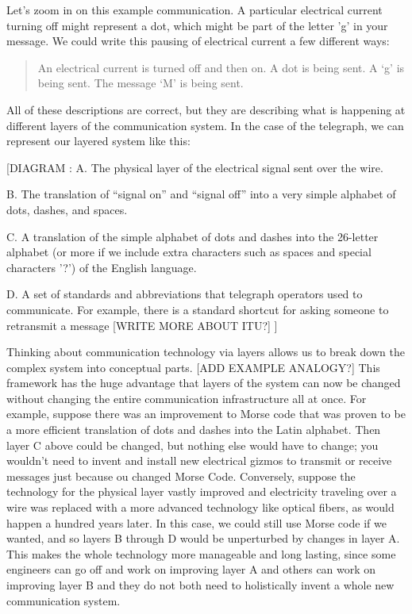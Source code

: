 \documentclass[UTF8]{book}
\begin{document}
\begin{CJK}{UTF8}{gbsn}
Let's zoom in on this example communication. A particular electrical current turning off might represent a dot, which might be part of the letter 'g' in your message. We could write this pausing of electrical current a few different ways:

\begin{quotation}
\centering
An electrical current is turned off and then on.
A dot is being sent.
A `g' is being sent.
The message `M' is being sent.
\end{quotation}

All of these descriptions are correct, but they are describing what is happening at different layers of the communication system. In the case of the telegraph, we can represent our layered system like this:

[DIAGRAM :
A. The physical layer of the electrical signal sent over the wire.

B. The translation of “signal on” and “signal off” into a very simple alphabet of dots, dashes, and spaces.

C. A translation of the simple alphabet of dots and dashes into the 26-letter alphabet (or more if we include extra characters such as spaces and special characters '?') of the English language.

D. A set of standards and abbreviations that telegraph operators used to communicate. For example, there is a standard shortcut for asking someone to retransmit a message [WRITE MORE ABOUT ITU?]
]

Thinking about communication technology via layers allows us to break down the complex system into conceptual parts. [ADD EXAMPLE ANALOGY?] This framework has the huge advantage that layers of the system can now be changed without changing the entire communication infrastructure all at once. For example, suppose there was an improvement to Morse code that was proven to be a more efficient translation of dots and dashes into the Latin alphabet. Then layer C above could be changed, but nothing else would have to change; you wouldn't need to invent and install new electrical gizmos to transmit or receive messages just because ou changed Morse Code. Conversely, suppose the technology for the physical layer vastly improved and electricity traveling over a wire was replaced with a more advanced technology like optical fibers, as would happen a hundred years later. In this case, we could still use Morse code if we wanted, and so layers B through D would be unperturbed by changes in layer A. This makes the whole technology more manageable and long lasting, since some engineers can go off and work on improving layer A and others can work on improving layer B and they do not both need to holistically invent a whole new communication system.


\end{CJK}
\end{document}
